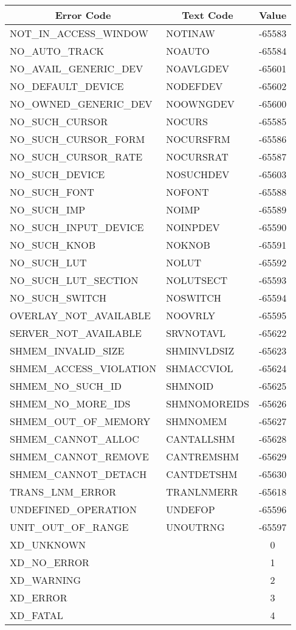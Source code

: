 \begin{tabular}{|l|l|c|}
\hline
\multicolumn{1}{|c|}{Error Code}
&\multicolumn{1}{|c|}{Text Code}
&\multicolumn{1}{|c|}{Value}\\
\hline
NOT\_IN\_ACCESS\_WINDOW & NOTINAW & -65583\\
NO\_AUTO\_TRACK & NOAUTO & -65584\\
NO\_AVAIL\_GENERIC\_DEV & NOAVLGDEV & -65601\\
NO\_DEFAULT\_DEVICE & NODEFDEV & -65602\\
NO\_OWNED\_GENERIC\_DEV & NOOWNGDEV & -65600\\
NO\_SUCH\_CURSOR & NOCURS & -65585\\
NO\_SUCH\_CURSOR\_FORM & NOCURSFRM & -65586\\
NO\_SUCH\_CURSOR\_RATE & NOCURSRAT & -65587\\
NO\_SUCH\_DEVICE & NOSUCHDEV & -65603\\
NO\_SUCH\_FONT & NOFONT & -65588\\
NO\_SUCH\_IMP & NOIMP & -65589\\
NO\_SUCH\_INPUT\_DEVICE & NOINPDEV & -65590\\
NO\_SUCH\_KNOB & NOKNOB & -65591\\
NO\_SUCH\_LUT & NOLUT & -65592\\
NO\_SUCH\_LUT\_SECTION & NOLUTSECT & -65593\\
NO\_SUCH\_SWITCH & NOSWITCH & -65594\\
OVERLAY\_NOT\_AVAILABLE & NOOVRLY & -65595\\
SERVER\_NOT\_AVAILABLE & SRVNOTAVL & -65622\\
SHMEM\_INVALID\_SIZE & SHMINVLDSIZ & -65623\\
SHMEM\_ACCESS\_VIOLATION & SHMACCVIOL & -65624\\
SHMEM\_NO\_SUCH\_ID & SHMNOID & -65625\\
SHMEM\_NO\_MORE\_IDS & SHMNOMOREIDS & -65626\\
SHMEM\_OUT\_OF\_MEMORY & SHMNOMEM & -65627\\
SHMEM\_CANNOT\_ALLOC & CANTALLSHM & -65628\\
SHMEM\_CANNOT\_REMOVE & CANTREMSHM & -65629\\
SHMEM\_CANNOT\_DETACH & CANTDETSHM & -65630\\
TRANS\_LNM\_ERROR & TRANLNMERR & -65618\\
UNDEFINED\_OPERATION & UNDEFOP & -65596\\
UNIT\_OUT\_OF\_RANGE & UNOUTRNG & -65597\\
XD\_UNKNOWN & & 0\\
XD\_NO\_ERROR & & 1\\
XD\_WARNING & & 2\\
XD\_ERROR & & 3\\
XD\_FATAL & & 4\\
\hline
\end{tabular}
\cleardoublepage
